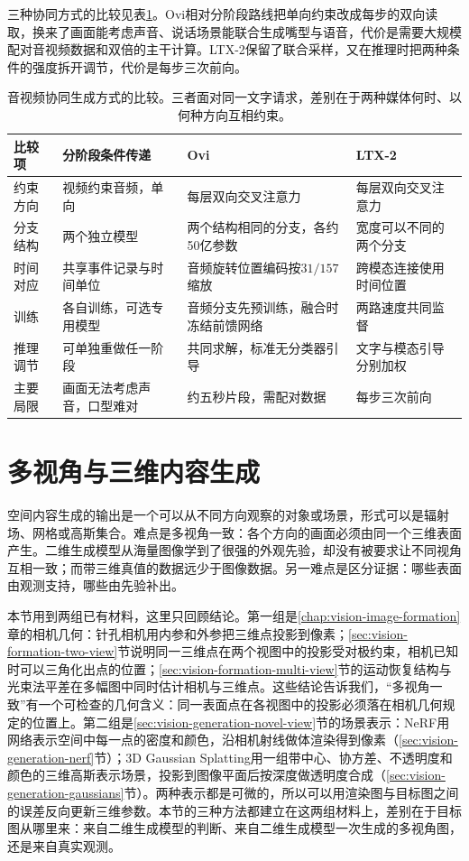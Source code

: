 三种协同方式的比较见表\ref{tab:vision-joint-compare}。Ovi相对分阶段路线把单向约束改成每步的双向读取，换来了画面能考虑声音、说话场景能联合生成嘴型与语音，代价是需要大规模配对音视频数据和双倍的主干计算。LTX-2保留了联合采样，又在推理时把两种条件的强度拆开调节，代价是每步三次前向。

\begin{table}[tbp]
 \centering
 \small
 \begin{tabularx}{\linewidth}{@{}p{22mm}XXX@{}}
  \toprule
  比较项 & 分阶段条件传递 & Ovi & LTX-2 \\
  \midrule
  约束方向 & 视频约束音频，单向 & 每层双向交叉注意力 & 每层双向交叉注意力 \\
  分支结构 & 两个独立模型 & 两个结构相同的分支，各约50亿参数 & 宽度可以不同的两个分支 \\
  时间对应 & 共享事件记录与时间单位 & 音频旋转位置编码按$31/157$缩放 & 跨模态连接使用时间位置 \\
  训练 & 各自训练，可选专用模型 & 音频分支先预训练，融合时冻结前馈网络 & 两路速度共同监督 \\
  推理调节 & 可单独重做任一阶段 & 共同求解，标准无分类器引导 & 文字与模态引导分别加权 \\
  主要局限 & 画面无法考虑声音，口型难对 & 约五秒片段，需配对数据 & 每步三次前向 \\
  \bottomrule
 \end{tabularx}
 \caption{音视频协同生成方式的比较。三者面对同一文字请求，差别在于两种媒体何时、以何种方向互相约束。}
 \label{tab:vision-joint-compare}
\end{table}
\FloatBarrier

\section{多视角与三维内容生成}
\label{sec:vision-multigen-3d}

空间内容生成的输出是一个可以从不同方向观察的对象或场景，形式可以是辐射场、网格或高斯集合。难点是多视角一致：各个方向的画面必须由同一个三维表面产生。二维生成模型从海量图像学到了很强的外观先验，却没有被要求让不同视角互相一致；而带三维真值的数据远少于图像数据。另一难点是区分证据：哪些表面由观测支持，哪些由先验补出。

本节用到两组已有材料，这里只回顾结论。第一组是\ref{chap:vision-image-formation}章的相机几何：针孔相机用内参和外参把三维点投影到像素；\ref{sec:vision-formation-two-view}节说明同一三维点在两个视图中的投影受对极约束，相机已知时可以三角化出点的位置；\ref{sec:vision-formation-multi-view}节的运动恢复结构与光束法平差在多幅图中同时估计相机与三维点。这些结论告诉我们，“多视角一致”有一个可检查的几何含义：同一表面点在各视图中的投影必须落在相机几何规定的位置上。第二组是\ref{sec:vision-generation-novel-view}节的场景表示：NeRF用网络表示空间中每一点的密度和颜色，沿相机射线做体渲染得到像素（\ref{sec:vision-generation-nerf}节）；3D Gaussian Splatting用一组带中心、协方差、不透明度和颜色的三维高斯表示场景，投影到图像平面后按深度做透明度合成（\ref{sec:vision-generation-gaussians}节）。两种表示都是可微的，所以可以用渲染图与目标图之间的误差反向更新三维参数。本节的三种方法都建立在这两组材料上，差别在于目标图从哪里来：来自二维生成模型的判断、来自二维生成模型一次生成的多视角图，还是来自真实观测。

